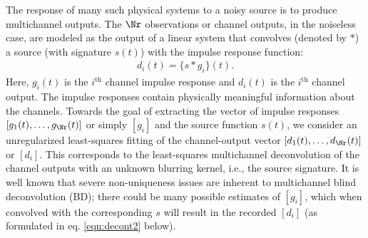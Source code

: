 \documentclass{article}
\theoremstyle{definition}
\def\vecc#1{[#1]}
\begin{document}
The response of many such physical systems 
to a noisy source is to produce multichannel outputs.
%
The $\Nr$ observations or channel outputs, in the noiseless case, are 
modeled as the output of a linear system that
convolves (denoted by $\ast$) a 
source (with signature $s(t)$) with
the impulse response function: 
%
\begin{eqnarray}
	d_{i}(t)=\{s\ast g_i\}(t). 
\end{eqnarray}
Here, $g_i(t)$ is the $i^\text{th}$ channel impulse response and
$d_i(t)$ is the $i^\text{th}$ channel output.
%
The impulse responses 
contain physically meaningful information about the channels.
%
Towards the goal of 
extracting the vector of impulse responses 
$\vecc{g_1(t),\ldots,g_{\Nr}(t)}$ or simply $\vecc{g_i}$
and the source function $s(t)$,
we consider 
an unregularized 
least-squares fitting of the
channel-output vector 
$\vecc{d_1(t),\ldots,d_{\Nr}(t)}$ or $\vecc{d_i}$. 
%
This corresponds to 
the least-squares multichannel 
deconvolution \citep{amari1997multichannel,douglas1997multichannel,sroubek2003multichannel}
of the channel outputs  
with an unknown blurring kernel, i.e., the source signature.
%
It is well known that
severe non-uniqueness issues {are} inherent to multichannel blind deconvolution (BD);
there could be many
possible estimates of $\vecc{g_i}$,
which when convolved with the corresponding $s$
will result in the recorded $\vecc{d_i}$ (as formulated in eq. \ref{eqn:decont2} below).
%
\end{document}
